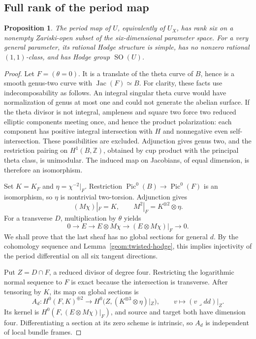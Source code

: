 \documentclass[11pt]{amsart}
\newcommand{\Z}{\mathbb Z}
\DeclareMathOperator{\SO}{SO}
\DeclareMathOperator{\Pic}{Pic}
\DeclareMathOperator{\Jac}{Jac}
\newtheorem{proposition}[theorem]{Proposition}
\theoremstyle{definition}
\theoremstyle{remark}
\numberwithin{equation}{section}
\begin{document}
\subsection{Full rank of the period map}

\begin{proposition}\label{geom:period}
The period map of $U$, equivalently of $U_X$, has rank six on a
nonempty Zariski-open subset of the six-dimensional parameter space.
For a very general parameter, its rational Hodge structure is simple,
has no nonzero rational $(1,1)$-class, and has Hodge group $\SO(U)$.
\end{proposition}

\begin{proof}
Let $F=(\theta=0)$.  It is a translate of the theta curve of $B$,
hence is a smooth genus-two curve with $\Jac(F)\simeq B$.
For clarity, these facts use indecomposability as follows.
An integral singular theta curve would have normalization of
genus at most one and could not generate the abelian surface.
If the theta divisor is not integral, ampleness and square two
force two reduced elliptic components meeting once, and hence the
product polarization: each component has positive integral
intersection with $H$ and nonnegative even self-intersection.
These possibilities are excluded.  Adjunction gives genus two,
and the restriction
pairing on $H^1(B,\Z)$, obtained by cup product with the principal
theta class, is unimodular.  The induced map on Jacobians, of equal
dimension, is therefore an isomorphism.

Set $K=K_F$ and $\eta=\chi^{-2}|_F$.  Restriction
$\Pic^0(B)\to\Pic^0(F)$ is an isomorphism, so $\eta$ is nontrivial
two-torsion.  Adjunction gives
\[
 (M\chi)|_F=K,\qquad M^2|_F=K^{\otimes2}\otimes\eta.
\]
For a transverse $D$, multiplication by $\theta$ yields
\begin{equation}\label{geom:quotient-sequence}
 0\longrightarrow E\longrightarrow E\otimes M\chi
       \longrightarrow(E\otimes M\chi)|_F\longrightarrow0.
\end{equation}
We shall prove that the last sheaf has no global sections for
general $d$.  By the cohomology sequence and
Lemma~\ref{geom:twisted-hodge}, this implies injectivity of the
period differential on all six tangent directions.

Put $Z=D\cap F$, a reduced divisor of degree four.  Restricting the
logarithmic normal sequence to $F$ is exact because the intersection
is transverse.  After tensoring by $K$, its map on global sections is
\begin{equation}\label{geom:tangency-matrix}
 A_d:H^0(F,K)^{\oplus2}\longrightarrow
 H^0\bigl(Z,(K^{\otimes3}\otimes\eta)|_Z\bigr),\qquad
 v\longmapsto (v\mathbin{\lrcorner}dd)|_Z.
\end{equation}
Its kernel is $H^0(F,(E\otimes M\chi)|_F)$, and source and target
both have dimension four.  Differentiating a section at its zero
scheme is intrinsic, so $A_d$ is independent of local bundle frames.


\end{proof}
\end{document}
